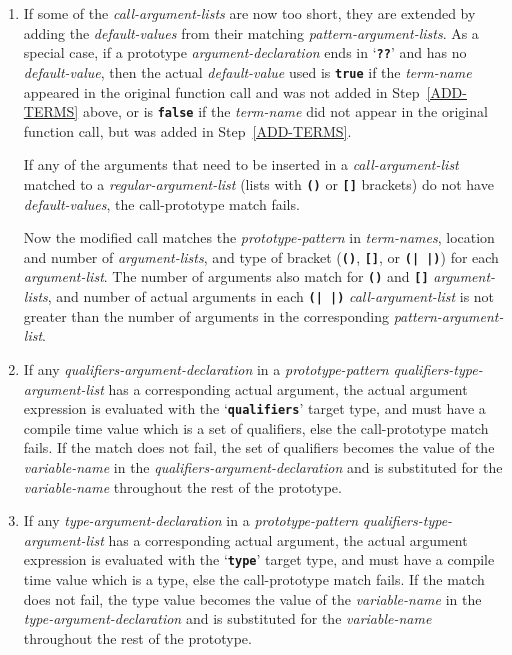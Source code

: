 \documentclass[12pt]{article}
\newcommand{\TT}[1]{{\tt \bfseries #1}}
\begin{document}
\begin{enumerate}
\item
If some of the {\em call-argument-lists} are now too short, they are extended
by adding the {\em default-values} from
their matching {\em pattern-argument-lists}.
As a special case, if a prototype {\em arg\-u\-ment-de\-clar\-a\-tion} ends in
`\TT{??}' and has no {\em default-value}, then the actual
{\em default-value} used is \TT{true} if the {\em term-name}
appeared in the original function call and was not added in
Step~\ref{ADD-TERMS} above, or is \TT{false} if the {\em term-name}
did not appear in the original function call, but was added in
Step~\ref{ADD-TERMS}.

If any of the arguments that need to be inserted in a
{\em call-argument-list} matched to a {\em regular-argument-list}
(lists with \TT{()} or \TT{[]} brackets)
do not have {\em default-values}, the call-prototype match fails.

Now the modified call matches
the {\em prototype-pattern} in {\em term-names},
location and number of {\em argument-lists}, and type of bracket (\TT{()},
\TT{[]}, or \TT{(|~|)}) for each {\em argument-list}.  The number of
arguments also match for \TT{()} and \TT{[]} {\em argument-lists},
and number of actual arguments in each \TT{(|~|)} {\em call-argument-list}
is not greater than the number of arguments in the corresponding
{\em pattern-argument-list}.

\item
If any {\em qualifiers-argument-declaration} in a {\em prototype-pattern}
{\em qualifiers-type-argument-list} has a corresponding
actual argument, the actual argument expression
is evaluated with the `\TT{qualifiers}' target type,
and must have a compile time value which is a set of qualifiers, else
the call-prototype match fails.  If the match does not fail,
the set of qualifiers becomes the value of the {\em variable-name}
in the {\em qualifiers-argument-declaration} and
is substituted for the {\em variable-name} throughout the rest of the
prototype.

\item
If any {\em type-argument-declaration} in a {\em prototype-pattern}
{\em qualifiers-type-argument-list} has a corresponding
actual argument, the actual argument expression
is evaluated with the `\TT{type}' target type,
and must have a compile time value which is a type, else
the call-prototype match fails.  If the match does not fail,
the type value becomes the value of the {\em variable-name}
in the {\em type-argument-declaration} and
is substituted for the {\em variable-name} throughout the rest of the
prototype.


\end{enumerate}
\end{document}
